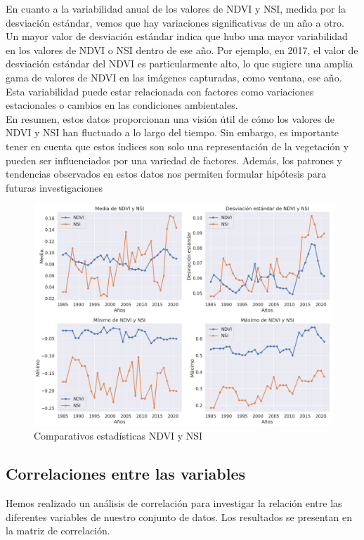 En cuanto a la variabilidad anual de los valores de NDVI y NSI, medida por la desviación estándar, vemos que hay variaciones significativas de un año a otro. Un mayor valor de desviación estándar indica que hubo una mayor variabilidad en los valores de NDVI o NSI dentro de ese año. Por ejemplo, en 2017, el valor de desviación estándar del NDVI es particularmente alto, lo que sugiere una amplia gama de valores de NDVI en las imágenes capturadas, como ventana, ese año. Esta variabilidad puede estar relacionada con factores como variaciones estacionales o cambios en las condiciones ambientales.\\

En resumen, estos datos proporcionan una visión útil de cómo los valores de NDVI y NSI han fluctuado a lo largo del tiempo. Sin embargo, es importante tener en cuenta que estos índices son solo una representación de la vegetación y pueden ser influenciados por una variedad de factores. Además, los patrones y tendencias observados en estos datos nos permiten formular hipótesis para futuras investigaciones\\


\begin{figure}[H]
    \centering
    \includegraphics[width=1.1\textwidth]{img_stats/graficas.png}
    \caption{Comparativos estadísticas NDVI y NSI}
    \label{fig:comparativos estadísticas NDVI y NSI}
\end{figure}


\newpage

\subsection{\textbf{Correlaciones entre las variables}}
Hemos realizado un análisis de correlación para investigar la relación entre las diferentes variables de nuestro conjunto de datos. Los resultados se presentan en la matriz de correlación.\\

